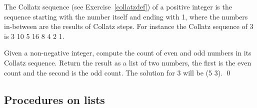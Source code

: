 \documentclass[a4paper,11pt]{article}
\begin{document}
\begin{uexercise}[*]

The Collatz sequence (see Exercise~\ref{collatzdef}) of a positive integer is the sequence
starting with the number itself and ending with 1, where the numbers
in-between are the results of Collatz steps. For instance the Collatz
sequence of 3 is 3 10 5 16 8 4 2 1.

Given a non-negative integer, compute the count of even and odd
numbers in its Collatz sequence. Return the result as a
list of two numbers, the first  is the even count and the
second is the odd count. The solution for 3 will be (5 3).
\qed
\end{uexercise}


\noindent\hrulefill

\subsection{Procedures on lists}
\end{document}
